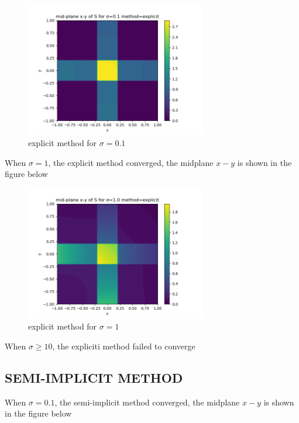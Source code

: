 \begin{figure}[H]
	\caption{explicit method for $\sigma = 0.1$}
	\centering
	\includegraphics[width=0.7\textwidth]{e_0.1}
\end{figure}

When $\sigma = 1$, the explicit method converged, the midplane $x-y$ is shown in the figure below

\begin{figure}[H]
	\caption{explicit method for $\sigma = 1$}
	\centering
	\includegraphics[width=0.7\textwidth]{e_1}
\end{figure}

When $\sigma \geq 10$, the expliciti method failed to converge

\subsection{SEMI-IMPLICIT METHOD}

When $\sigma = 0.1$, the semi-implicit method converged, the midplane $x-y$ is shown in the figure below

